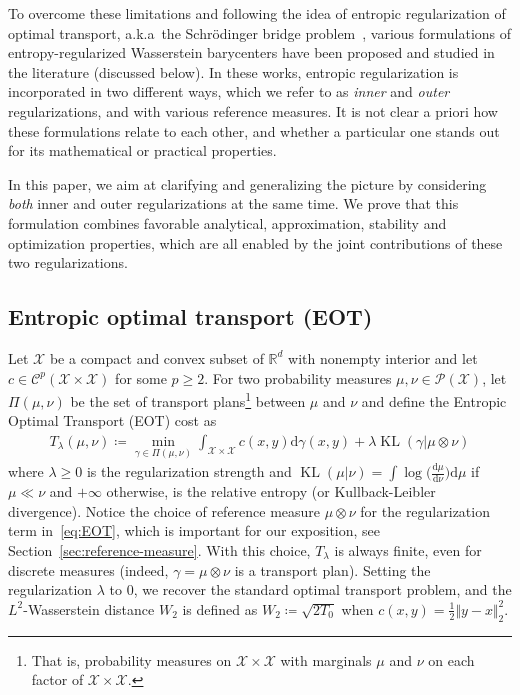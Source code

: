\documentclass[11pt]{article}
\newcommand{\RR}{\mathbb{R}}
\newcommand{\Cc}{\mathcal{C}}
\newcommand{\Pp}{\mathcal{P}}
\newcommand{\Xx}{\mathcal{X}}
\renewcommand{\d}{\mathrm{d}}
\DeclareMathOperator{\KL}{KL}
\begin{document}
To overcome these limitations and following the idea of entropic regularization of optimal transport, a.k.a~the Schr\"odinger bridge problem~\cite{schrodinger1932theorie,wilson1969use,erlander1990gravity,kosowsky1994invisible,leonard2012schrodinger,cuturi2013sinkhorn}, various formulations of entropy-regularized Wasserstein barycenters have been proposed and studied in the literature (discussed below). In these works, entropic regularization is incorporated in two different ways, which we refer to as \emph{inner} and \emph{outer} regularizations, and with various reference measures. It is not clear a priori how these formulations relate to each other, and whether a particular one stands out for its mathematical or practical properties.

In this paper, we aim at clarifying and generalizing the picture by considering \emph{both} inner and outer regularizations at the same time. We prove that this formulation combines favorable analytical, approximation, stability and optimization properties, which are all enabled by the joint contributions of these two regularizations.


\subsection{Entropic optimal transport (EOT)}
Let $\Xx$ be a compact and convex subset of $\RR^d$ with nonempty interior and let $c\in \Cc^p(\Xx\times\Xx)$ for some $p\geq 2$.
For two probability measures $\mu, \nu \in \Pp(\Xx)$, let $\Pi(\mu,\nu)$ be the set of transport plans\footnote{That is, probability measures on $\Xx\times \Xx$ with marginals $\mu$ and $\nu$ on each factor of $\Xx\times \Xx$.} between $\mu$ and $\nu$ and define the Entropic Optimal Transport (EOT) cost   as
\begin{align}\label{eq:EOT}
T_\lambda(\mu,\nu) \coloneqq \min_{\gamma \in \Pi(\mu,\nu)} \int_{\Xx\times \Xx} c(x,y) \d\gamma(x,y) + \lambda \KL(\gamma | \mu\otimes \nu) 
\end{align}
where $\lambda\geq 0$ is the regularization strength and $\KL(\mu|\nu)=\int \log\big(\frac{\d\mu}{\d\nu}\big)\d\mu$ if $\mu\ll\nu$ and $+\infty$ otherwise, is the relative entropy (or Kullback-Leibler divergence). Notice the choice of reference measure $\mu\otimes \nu$ for the regularization term in~\eqref{eq:EOT}, which is important for our exposition, see Section~\ref{sec:reference-measure}. With this choice, $T_\lambda$ is always finite, even for discrete measures (indeed, $\gamma=\mu\otimes \nu$ is a transport plan). Setting the regularization $\lambda$ to $0$, we recover the standard optimal transport problem, and the $L^2$-Wasserstein distance $W_2$ is defined as $W_2\coloneqq \sqrt{2T_0}$ when $c(x,y)=\frac12 \Vert y-x\Vert^2_2$. 
\end{document}
